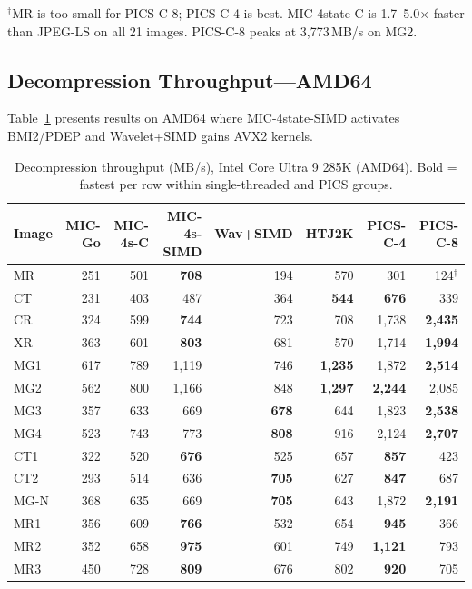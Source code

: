 \documentclass[journal]{IEEEtran}
\begin{document}
$^\dagger$MR is too small for PICS-C-8; PICS-C-4 is best.
MIC-4state-C is 1.7--5.0$\times$ faster than JPEG-LS on all 21 images.
PICS-C-8 peaks at 3,773\,MB/s on MG2.

\subsection{Decompression Throughput---AMD64}

Table~\ref{tab:decomp-amd64} presents results on AMD64 where MIC-4state-SIMD
activates BMI2/PDEP and Wavelet+SIMD gains AVX2 kernels.

\begin{table}[t]
\centering
\caption{Decompression throughput (MB/s), Intel Core Ultra 9 285K (AMD64).
Bold = fastest per row within single-threaded and PICS groups.}
\label{tab:decomp-amd64}
\scriptsize
\begin{tabular}{lrrrrrrr}
\toprule
Image & MIC-Go & MIC-4s-C & MIC-4s-SIMD & Wav+SIMD & HTJ2K & PICS-C-4 & PICS-C-8 \\
\midrule
MR   & 251 & 501 & \textbf{708} & 194 & 570 & 301 & 124$^\dagger$ \\
CT   & 231 & 403 & 487 & 364 & \textbf{544} & \textbf{676} & 339 \\
CR   & 324 & 599 & \textbf{744} & 723 & 708 & 1,738 & \textbf{2,435} \\
XR   & 363 & 601 & \textbf{803} & 681 & 570 & 1,714 & \textbf{1,994} \\
MG1  & 617 & 789 & 1,119 & 746 & \textbf{1,235} & 1,872 & \textbf{2,514} \\
MG2  & 562 & 800 & 1,166 & 848 & \textbf{1,297} & \textbf{2,244} & 2,085 \\
MG3  & 357 & 633 & 669 & \textbf{678} & 644 & 1,823 & \textbf{2,538} \\
MG4  & 523 & 743 & 773 & \textbf{808} & 916 & 2,124 & \textbf{2,707} \\
CT1  & 322 & 520 & \textbf{676} & 525 & 657 & \textbf{857} & 423 \\
CT2  & 293 & 514 & 636 & \textbf{705} & 627 & \textbf{847} & 687 \\
MG-N & 368 & 635 & 669 & \textbf{705} & 643 & 1,872 & \textbf{2,191} \\
MR1  & 356 & 609 & \textbf{766} & 532 & 654 & \textbf{945} & 366 \\
MR2  & 352 & 658 & \textbf{975} & 601 & 749 & \textbf{1,121} & 793 \\
MR3  & 450 & 728 & \textbf{809} & 676 & 802 & \textbf{920} & 705 \\

\end{tabular}
\end{table}
\end{document}
